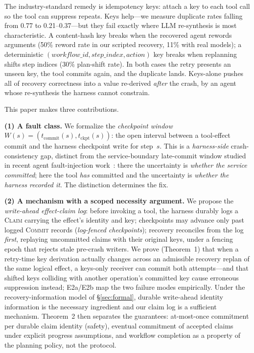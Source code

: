 \documentclass[10pt,journal,compsoc]{IEEEtran}
\begin{document}
The industry-standard remedy is idempotency keys: attach a key to
each tool call so the tool can suppress repeats. Keys help---we
measure duplicate rates falling from 0.77 to 0.21--0.37---but they
fail exactly where LLM re-synthesis is most characteristic. A
content-hash key breaks when the recovered agent rewords arguments
(50\% reword rate in our scripted recovery, 11\% with real models);
a deterministic $(\mathit{workflow\_id}, \mathit{step\_index},
\mathit{action})$ key breaks when replanning shifts step indices
(30\% plan-shift rate). In both cases the retry presents an unseen
key, the tool commits again, and the duplicate lands. Keys-alone
pushes all of recovery correctness into a value re-derived
\emph{after} the crash, by an agent whose re-synthesis the harness
cannot constrain.

This paper makes three contributions.

\textbf{(1) A fault class.} We formalize the \emph{checkpoint
window} $W(s) = (t_{\mathrm{commit}}(s), t_{\mathrm{ckpt}}(s))$:
the open interval between a tool-effect commit and the harness
checkpoint write for step~$s$. This is a \emph{harness-side}
crash-consistency gap, distinct from the service-boundary
late-commit window studied in recent agent fault-injection
work~\cite{limbo2026}: there the uncertainty is \emph{whether the
service committed}; here the tool \emph{has} committed and the
uncertainty is \emph{whether the harness recorded it}. The
distinction determines the fix.

\textbf{(2) A mechanism with a scoped necessity argument.} We propose the
\emph{write-ahead effect-claim log}: before invoking a tool, the
harness durably logs a \textsc{Claim} carrying the effect's
identity and key; checkpoints may advance only past logged
\textsc{Commit} records (\emph{log-fenced checkpoints}); recovery
reconciles from the log \emph{first}, replaying uncommitted claims
with their original keys, under a fencing epoch that rejects stale
pre-crash writers. We prove (Theorem~1) that when a retry-time key
derivation actually changes across an admissible recovery replan of
the same logical effect, a keys-only receiver can commit both
attempts---and that shifted keys colliding with another operation's
committed key cause erroneous suppression instead; E2a/E2b map the
two failure modes empirically. Under the recovery-information model
of \S\ref{sec:formal}, durable write-ahead identity information is
the necessary ingredient and our claim log is a sufficient
mechanism. Theorem~2 then separates the guarantees: at-most-once
commitment per durable claim identity (safety), eventual commitment
of accepted claims under explicit progress assumptions, and workflow
completion as a property of the planning policy, not the protocol.
\end{document}
